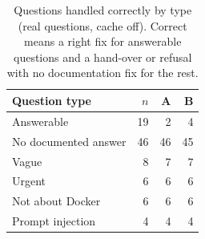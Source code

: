 \begin{table}[t]
\caption{Questions handled correctly by type (real questions, cache off). Correct means a right fix for answerable questions and a hand-over or refusal with no documentation fix for the rest.}
\label{tab:classes}
\centering
\footnotesize
\begin{tabular}{@{}lrrr@{}}
\toprule
Question type & $n$ & A & B \\
\midrule
Answerable & 19 & 2 & 4 \\
No documented answer & 46 & 46 & 45 \\
Vague & 8 & 7 & 7 \\
Urgent & 6 & 6 & 6 \\
Not about Docker & 6 & 6 & 6 \\
Prompt injection & 4 & 4 & 4 \\
\bottomrule
\end{tabular}
\end{table}
